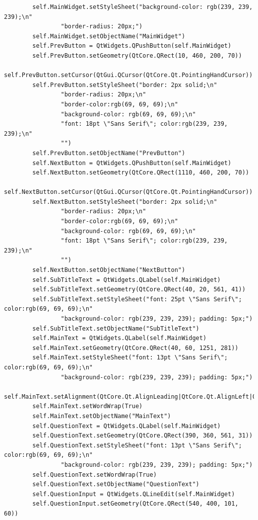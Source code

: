 \documentclass[12pt]{article}
\begin{document}
\begin{lstlisting}
        self.MainWidget.setStyleSheet("background-color: rgb(239, 239, 239);\n"
                "border-radius: 20px;")
        self.MainWidget.setObjectName("MainWidget")
        self.PrevButton = QtWidgets.QPushButton(self.MainWidget)
        self.PrevButton.setGeometry(QtCore.QRect(10, 460, 200, 70))
        self.PrevButton.setCursor(QtGui.QCursor(QtCore.Qt.PointingHandCursor))
        self.PrevButton.setStyleSheet("border: 2px solid;\n"
                "border-radius: 20px;\n"
                "border-color:rgb(69, 69, 69);\n"
                "background-color: rgb(69, 69, 69);\n"
                "font: 18pt \"Sans Serif\"; color:rgb(239, 239, 239);\n"
                "")
        self.PrevButton.setObjectName("PrevButton")
        self.NextButton = QtWidgets.QPushButton(self.MainWidget)
        self.NextButton.setGeometry(QtCore.QRect(1110, 460, 200, 70))
        self.NextButton.setCursor(QtGui.QCursor(QtCore.Qt.PointingHandCursor))
        self.NextButton.setStyleSheet("border: 2px solid;\n"
                "border-radius: 20px;\n"
                "border-color:rgb(69, 69, 69);\n"
                "background-color: rgb(69, 69, 69);\n"
                "font: 18pt \"Sans Serif\"; color:rgb(239, 239, 239);\n"
                "")
        self.NextButton.setObjectName("NextButton")
        self.SubTitleText = QtWidgets.QLabel(self.MainWidget)
        self.SubTitleText.setGeometry(QtCore.QRect(40, 20, 561, 41))
        self.SubTitleText.setStyleSheet("font: 25pt \"Sans Serif\"; color:rgb(69, 69, 69);\n"
                "background-color: rgb(239, 239, 239); padding: 5px;")
        self.SubTitleText.setObjectName("SubTitleText")
        self.MainText = QtWidgets.QLabel(self.MainWidget)
        self.MainText.setGeometry(QtCore.QRect(40, 60, 1251, 281))
        self.MainText.setStyleSheet("font: 13pt \"Sans Serif\"; color:rgb(69, 69, 69);\n"
                "background-color: rgb(239, 239, 239); padding: 5px;")
        self.MainText.setAlignment(QtCore.Qt.AlignLeading|QtCore.Qt.AlignLeft|QtCore.Qt.AlignTop)
        self.MainText.setWordWrap(True)
        self.MainText.setObjectName("MainText")
        self.QuestionText = QtWidgets.QLabel(self.MainWidget)
        self.QuestionText.setGeometry(QtCore.QRect(390, 360, 561, 31))
        self.QuestionText.setStyleSheet("font: 13pt \"Sans Serif\"; color:rgb(69, 69, 69);\n"
                "background-color: rgb(239, 239, 239); padding: 5px;")
        self.QuestionText.setWordWrap(True)
        self.QuestionText.setObjectName("QuestionText")
        self.QuestionInput = QtWidgets.QLineEdit(self.MainWidget)
        self.QuestionInput.setGeometry(QtCore.QRect(540, 400, 101, 60))

\end{lstlisting}
\end{document}
